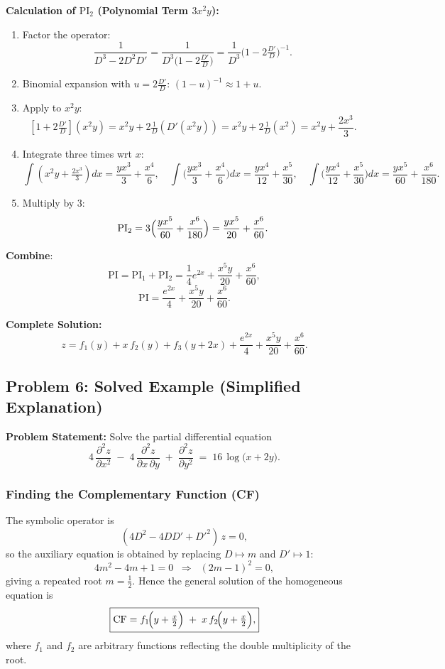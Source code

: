 \documentclass{article}
\theoremstyle{remark}
\begin{document}
	\textbf{Calculation of \(\text{PI}_2\) (Polynomial Term \(3x^2y\)):}
	\begin{enumerate}
		\item Factor the operator:
		\[
		\frac{1}{D^3 -2D^2D'} 
		= \frac{1}{D^3\bigl(1 -2\tfrac{D'}{D}\bigr)}
		= \frac{1}{D^3}\bigl(1 -2\tfrac{D'}{D}\bigr)^{-1}.
		\]
		\item Binomial expansion with \(u=2\tfrac{D'}{D}\): 
		\((1-u)^{-1}\approx1+u\).
		\item Apply to \(x^2y\):
		\[
		[1+2\tfrac{D'}{D}](x^2y)
		= x^2y +2\tfrac{1}{D}(D'(x^2y))
		= x^2y +2\tfrac{1}{D}(x^2)
		= x^2y + \frac{2x^3}{3}.
		\]
		\item Integrate three times wrt \(x\):
		\[
		\int(x^2y+\tfrac{2x^3}{3})dx
		= \frac{yx^3}{3}+\frac{x^4}{6},\quad
		\int\bigl(\frac{yx^3}{3}+\frac{x^4}{6}\bigr)dx
		= \frac{yx^4}{12}+\frac{x^5}{30},\quad
		\int\bigl(\frac{yx^4}{12}+\frac{x^5}{30}\bigr)dx
		= \frac{yx^5}{60}+\frac{x^6}{180}.
		\]
		\item Multiply by 3:
		\[
		\text{PI}_2 =3\Bigl(\frac{yx^5}{60}+\frac{x^6}{180}\Bigr)
		= \frac{yx^5}{20}+\frac{x^6}{60}.
		\]
	\end{enumerate}
	
	\textbf{Combine}:
	\[
	\text{PI} 
	= \text{PI}_1 + \text{PI}_2
	= \frac{1}{4}e^{2x} + \frac{x^5y}{20} + \frac{x^6}{60},
	\]
	\[
	\boxed{\text{PI} 
		= \frac{e^{2x}}{4} + \frac{x^5y}{20} + \frac{x^6}{60}}.
	\]
	
	\textbf{Complete Solution:}
	\[
	\boxed{z = f_1(y) + x\,f_2(y) + f_3(y+2x) + \frac{e^{2x}}{4} + \frac{x^5y}{20} + \frac{x^6}{60}}.
	\]
	
	\subsection{Problem 6: Solved Example (Simplified Explanation)}
	\textbf{Problem Statement:} Solve the partial differential equation
	\[
	4\,\frac{\partial^2 z}{\partial x^2}
	\;-\;4\,\frac{\partial^2 z}{\partial x\,\partial y}
	\;+\;\frac{\partial^2 z}{\partial y^2}
	\;=\;16\,\log\bigl(x+2y\bigr).
	\]
	
	\subsubsection{Finding the Complementary Function (CF)}
	The symbolic operator is
	\[
	(4D^2 - 4DD' + D'^2)\,z = 0,
	\]
	so the auxiliary equation is obtained by replacing \(D\mapsto m\) and \(D'\mapsto 1\):
	\[
	4m^2 - 4m + 1 = 0
	\;\;\Longrightarrow\;\;
	(2m - 1)^2 = 0,
	\]
	giving a repeated root \(m = \tfrac12\). Hence the general solution of the homogeneous equation is
	\[
	\boxed{\mathrm{CF}
		= f_1\!\Bigl(y + \tfrac{x}{2}\Bigr)
		\;+\;
		x\,f_2\!\Bigl(y + \tfrac{x}{2}\Bigr),}
	\]
	where \(f_1\) and \(f_2\) are arbitrary functions reflecting the double multiplicity of the root.
	
\end{document}
